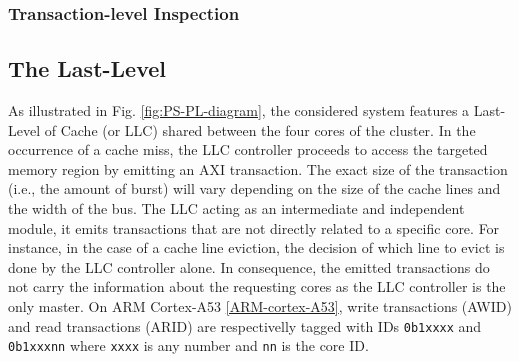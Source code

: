     \subsubsection{Transaction-level Inspection}

  \subsection{The Last-Level}
      As illustrated in Fig. \ref{fig:PS-PL-diagram}, the considered system features a Last-Level of Cache (or LLC) shared between the four cores of the cluster. In the occurrence of a cache miss, the LLC controller proceeds to access the targeted memory region by emitting an AXI transaction. The exact size of the transaction (i.e., the amount of burst) will vary depending on the size of the cache lines and the width of the bus. The LLC acting as an intermediate and independent module, it emits transactions that are not directly related to a specific core. For instance, in the case of a cache line eviction, the decision of which line to evict is done by the LLC controller alone. In consequence, the emitted transactions do not carry the information about the requesting cores as the LLC controller is the only master. On ARM Cortex-A53 \ref{ARM-cortex-A53}, write transactions (AWID) and read transactions (ARID) are respectivelly tagged with IDs  \verb|0b1xxxx| and \verb|0b1xxxnn| where \verb|xxxx| is any number and \verb|nn| is the core ID.

